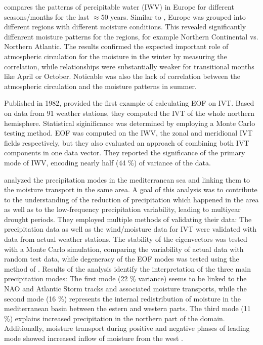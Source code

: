 \citeauthor{wypych_atmospheric_2018} compares the patterns of percipitable water (IWV) in Europe for different seasons/months for the last $\approx50$ years. 
Similar to \cite{ayantobo_integrated_2022}, Europe was grouped into different regions with different moisture conditions. 
This revealed significantly diffenrent moisture patterns for the regions, for example Northern Continental vs. Northern Atlantic.
The results confirmed the expected important role of atmospheric circulation for the moisture in the winter by measuring the correlation, while relationships were substantially weaker for transitional months like April or October. 
Noticable was also the lack of correlation between the atmospheric circulation and the moisture patterns in summer. 



Published in 1982, \citeauthor{salstein_modes_1983} provided the first example of calculating EOF on IVT. 
Based on data from 91 weather stations, they computed the IVT of the whole northern hemisphere. 
Statistical siginificance was determined by employing a Monte Carlo testing method. 
EOF was computed on the IWV, the zonal and meridional IVT fields respectively, but they also evaluated an approach of combining both IVT components in one data vector. 
They reported the significance of the primary mode of IWV, encoding nearly half (44 \%) of variance of the data. 


\citeauthor{fernandez_analysis_2003} analyzed the precipitation modes in the mediterranean sea and linking them to the moisture transport in the same area. 
A goal of this analysis was to contribute to the understanding of the reduction of precipitation which happened in the area as well as to the low-frequency precipitation variability, leading to multiyear drought periods.
They employed multiple methods of validating their data: The precipitation data as well as the wind/moisture data for IVT were validated with data from actual weather stations. 
The stability of the eigenvectors was tested with a Monte Carlo simulation, comparing the variability of actual data with random test data, while degeneracy of the EOF modes was tested using the method of \citeauthor{north_sampling_1982} \cite{north_sampling_1982}. 
Results of the analysis identify the interpretation of the three main precipitation modes:
The first mode (22 \% variance) seems to be linked to the NAO and Atlantic Storm tracks and associated moisture transports, while the second mode (16 \%) represents the internal redistribution of moisture in the mediterranean basin between the estern and western parts.  
The third mode (11 \%) explains increased precipitation in the northern part of the domain. 
Additionally, moisture transport during positive and negative phases of leading mode showed increased inflow of moisture from the west \cite{fernandez_analysis_2003}. 



